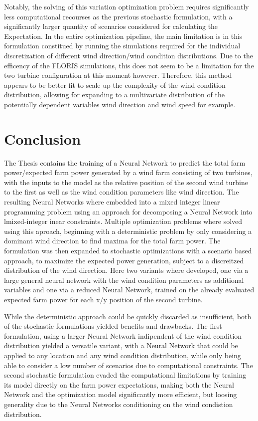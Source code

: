 \documentclass[preprint,12pt]{elsarticle}
\begin{document}
Notably, the solving of this variation optimization problem requires significantly less computational recourses as the previous stochastic formulation, with a significantly larger quantity of scenarios considered for calculating the Expectation. In the entire optimization pipeline, the main limitation is in this formulation constitued by running the simulations required for the individual discretization of different wind direction/wind condition distributions. Due to the efficency of the FLORIS simulations, this does not seem to be a limitation for the two turbine configuration at this moment however. Therefore, this method appears to be better fit to scale up the complexity of the wind condition distribution, allowing for expanding to a multivariate distribution of the potentially dependent variables wind direction and wind speed for example. 



\section{Conclusion}\label{chapter:conclusion}

The Thesis contains the training of a Neural Network to predict the total farm power/expected farm power generated by a wind farm consisting of two turbines, with the inputs to the model as the relative position of the second wind turbine to the first as well as the wind condition parameters like wind direction. The resulting Neural Networks where embedded into a mixed integer linear programming problem using an approach for decomposing a Neural Network into lmixed-integer inear constraints. Multiple optimization problems where solved using this aproach, beginning with a deterministic problem by only considering a dominant wind direction to find maxima for the total farm power. The formulation was then expanded to stochastic optimizations with a scenario based approach, to maximize the expected power generation, subject to a discreitzed distribution of the wind direction. Here two variants where developed, one via a large general neural network with the wind condition parameters as additional variables and one via a reduced Neural Network, trained on the already evaluated expected farm power for each x/y position of the second turbine. 

While the deterministic approach could be quickly discarded as insufficient, both of the stochastic formulations yielded benefits and drawbacks. The first formulation, using a larger Neural Network indipendent of the wind condition distribution yielded a versatile variant, with a Neural Network that could be applied to any location and any wind condition distribution, while only being able to consider a low number of scenarios due to computational constraints. The second stochastic formulation evaded the computational limitations by training its model directly on the farm power expectations, making both the Neural Network and the optimization model significantly more efficient, but loosing generality due to the Neural Networks conditioning on the wind condistion distribution.
\end{document}
